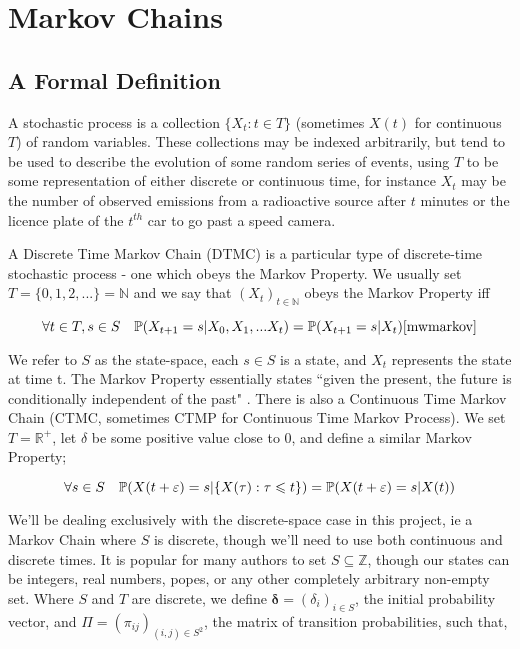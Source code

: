 \section{Markov Chains}

\subsection{A Formal Definition}

A stochastic process \cite[p590]{doob96} is a collection $\{X_t : t \in T\}$ (sometimes $X(t)$ for continuous $T$) of random variables. These collections may be indexed arbitrarily, but tend to be used to describe the evolution of some random series of events, using $T$ to be some representation of either discrete or continuous time, for instance $X_t$ may be the number of observed emissions from a radioactive source after $t$ minutes or the licence plate of the $t^{th}$ car to go past a speed camera.

A Discrete Time Markov Chain (DTMC) is a particular type of discrete-time stochastic process - one which obeys the Markov Property. We usually set $T=\{0,1,2,...\}=\mathbb{N}$ and we say that $(X_t)_{t \in \mathbb{N}}$ obeys the Markov Property iff

$$
\forall t \in T, s \in S \quad \mathbb{P} (X_{t+1} = s | X_0, X_1, ... X_t) = \mathbb{P} (X_{t+1} = s | X_t)\cite{mwmarkov}
$$

We refer to $S$ as the state-space, each $s \in S$ is a state, and $X_t$ represents the state at time t. The Markov Property essentially states ``given the present, the future is conditionally independent of the past" \cite{mwmarkov}. There is also a Continuous Time Markov Chain (CTMC, sometimes CTMP for Continuous Time Markov Process). We set $T=\mathbb{R}^{+}$, let $\delta$ be some positive value close to 0, and define a similar Markov Property;

$$
\forall s \in S \quad \mathbb{P} (X(t+\varepsilon) = s | \{X(\tau) : \tau \leqslant t\}) = \mathbb{P} (X(t+\varepsilon) = s | X(t))
$$

We'll be dealing exclusively with the discrete-space case in this project, ie a Markov Chain where $S$ is discrete, though we'll need to use both continuous and discrete times. It is popular for many authors to set $S \subseteq \mathbb{Z}$, though our states can be integers, real numbers, popes, or any other completely arbitrary non-empty set. Where $S$ and $T$ are discrete, we define $\mathbf{\delta} = (\delta_i)_{i \in S}$, the initial probability vector, and $\Pi = (\pi_{ij})_{(i,j) \in S^2}$, the matrix of transition probabilities, such that,

